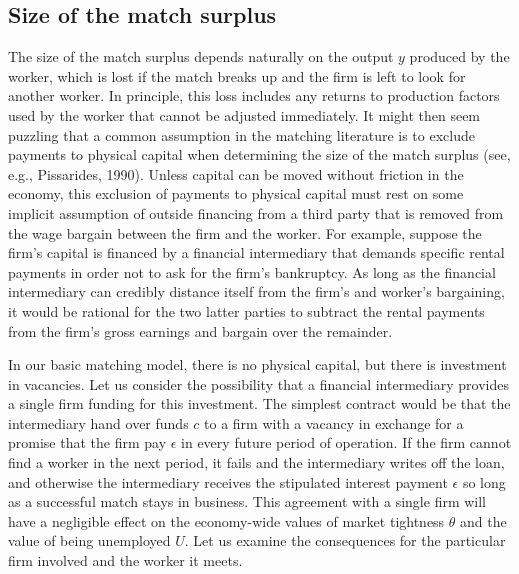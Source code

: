 \subsection{Size of the match surplus}
The size of the match surplus depends naturally on the output $y$
produced by the worker, which is lost if the match breaks up and
the firm is left to look for another worker. In principle,
this loss includes any returns to production factors used by the
worker that cannot be adjusted immediately. It might then
seem puzzling that a common assumption in the matching literature
is to exclude payments to physical capital when determining the
size of the match surplus (see, e.g., Pissarides, 1990).
%
Unless capital can be moved without friction in the economy,
this exclusion of payments to physical capital must rest on some
implicit assumption of outside financing from a third party that
is removed from the wage bargain between the firm and the worker.
For example, suppose the firm's capital is financed by a financial
intermediary that demands specific rental payments in order
not to ask for the firm's bankruptcy.
As long as the financial intermediary can credibly distance itself
from the firm's and worker's bargaining, it would be rational for
the two latter parties to subtract the rental payments from the
firm's gross earnings and bargain over the remainder.

In our basic matching model, there is no physical capital, but
there is investment in vacancies. Let us consider the possibility
that a financial intermediary provides a single firm funding for this
investment. The simplest contract would
be that the intermediary hand over funds $c$ to a firm with a
vacancy in exchange for a promise that the firm pay
$\epsilon$ in every future period of operation. If the firm cannot
find a worker in the next period, it fails and the intermediary
writes off the loan, and otherwise the intermediary receives the
stipulated interest payment $\epsilon$ so long as a successful
match stays in business. This agreement with a single firm will
have a negligible effect on the economy-wide values of market
tightness $\theta$ and
the value of being unemployed $U$. Let us examine the consequences
for the particular firm involved and the worker it meets.

